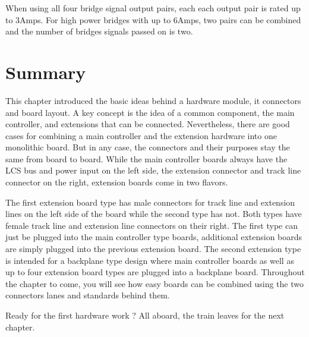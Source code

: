 \FloatBarrier

When using all four bridge signal output pairs, each each output pair is rated up to 3Amps. For high power bridges with up to 6Amps, two pairs can be combined and the number of bridges signals passed on is two.

\section{Summary}

This chapter introduced the basic ideas behind a hardware module, it connectors and board layout. A key concept is the idea of a common component, the main controller, and extensions that can be connected. Nevertheless, there are good cases for combining a main controller and the extension hardware into one monolithic board. But in any case, the connectors and their purposes stay the same from board to board. While the main controller boards always have the LCS bus and power input on the left side, the extension connector and track line connector on the right, extension boards come in two flavors. 

The first extension board type has male connectors for track line and extension lines on the left side of the board while the second type has not. Both types have female track line and extension line connectors on their right. The first type can just be plugged into the main controller type boards, additional extension boards are simply plugged into the previous extension board. The second extension type is intended for a backplane type design where main controller boards as well as up to four extension board types are plugged into a backplane board. Throughout the chapter to come, you will see how easy boards can be combined using the two connectors lanes and standards behind them. 

Ready for the first hardware work ? All aboard, the train leaves for the next chapter.

